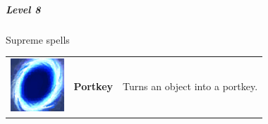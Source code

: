 \subparagraph{Level 8} 
Supreme spells \\
\begin{tabular}{ m{2cm}m{3cm}m{8cm} } 
  	\includegraphics[width=2cm]{../Pictures/Gameplay/Spells/Icon/Portkey_spell_icon.png} & \textbf{Portkey} & Turns an object into a portkey.\\ 
\end{tabular}


\pagebreak









